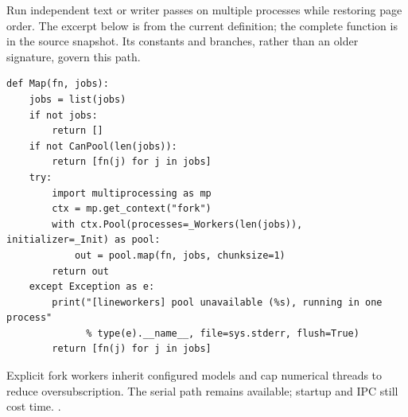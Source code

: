 Run independent text or writer passes on multiple processes while restoring page order. The excerpt below is from the current definition; the complete function is in the source snapshot. Its constants and branches, rather than an older signature, govern this path.


\begin{lstlisting}[style=plain]
def Map(fn, jobs):
    jobs = list(jobs)
    if not jobs:
        return []
    if not CanPool(len(jobs)):
        return [fn(j) for j in jobs]
    try:
        import multiprocessing as mp
        ctx = mp.get_context("fork")
        with ctx.Pool(processes=_Workers(len(jobs)), initializer=_Init) as pool:
            out = pool.map(fn, jobs, chunksize=1)
        return out
    except Exception as e:
        print("[lineworkers] pool unavailable (%s), running in one process"
              % type(e).__name__, file=sys.stderr, flush=True)
        return [fn(j) for j in jobs]
\end{lstlisting}
Explicit fork workers inherit configured models and cap numerical threads to reduce oversubscription. The serial path remains available; startup and IPC still cost time. \cite{pythonmp,numpymatmul}.

